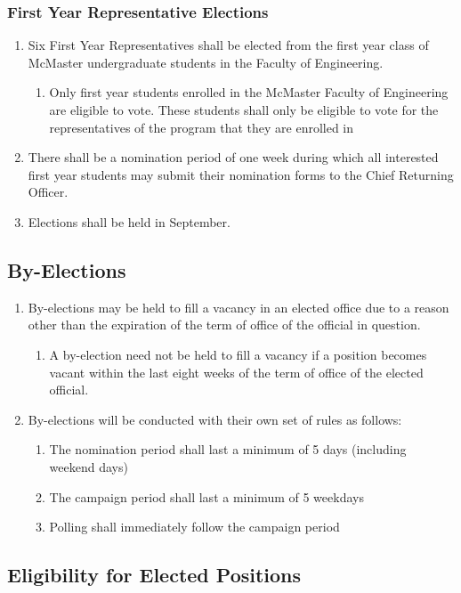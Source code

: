 \hypertarget{first-year-representative-elections}{%
 \subsubsection{First Year Representative
  Elections}
 \label{first-year-representative-elections}}
\begin{enumerate}
 \item
  Six First Year Representatives shall be elected from the first year
  class of McMaster undergraduate students in the Faculty of
  Engineering.

  \begin{enumerate}
   \item
    Only first year students enrolled in the McMaster Faculty of
    Engineering are eligible to vote. These students shall only be
    eligible to vote for the representatives of the program that they
    are enrolled in
  \end{enumerate}
 \item
  There shall be a nomination period of one week during which all
  interested first year students may submit their nomination forms to
  the Chief Returning Officer.
 \item
  Elections shall be held in September.
\end{enumerate}
\hypertarget{by-elections}{%
 \subsection{By-Elections}
 \label{by-elections}}


\begin{enumerate}
 \item
  By-elections may be held to fill a vacancy in an elected office due to
  a reason other than the expiration of the term of office of the
  official in question.

  \begin{enumerate}
   \item
    A by-election need not be held to fill a vacancy if a position
    becomes vacant within the last eight weeks of the term of office of
    the elected official.
  \end{enumerate}
 \item
  By-elections will be conducted with their own set of rules as follows:

  \begin{enumerate}
   \item
    The nomination period shall last a minimum of 5 days (including
    weekend days)
   \item
    The campaign period shall last a minimum of 5 weekdays
   \item
    Polling shall immediately follow the campaign period
  \end{enumerate}
\end{enumerate}
\hypertarget{eligibility-for-elected-positions}{%
 \subsection{Eligibility for Elected
  Positions}
 \label{eligibility-for-elected-positions}}


